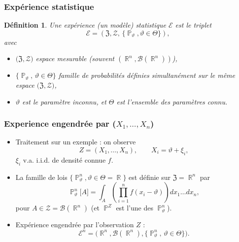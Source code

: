 ﻿\documentclass{beamer}
\newtheorem{df}{Définition}
\DeclareMathOperator{\R}{{\mathbb R}}
\DeclareMathOperator{\PP}{{\mathbb P}}
\begin{document}
\begin{frame}
\frametitle{Expérience statistique}
\begin{df}
Une expérience (un modèle) statistique ${\mathcal E}$ est le triplet
$${\mathcal E} = \left(\mathfrak{Z}, {\mathcal Z}, \,\big\{\PP_\vartheta, \vartheta \in \Theta\big\}\right),$$
avec
\begin{itemize}
\item $\big(\mathfrak{Z}, {\mathcal Z}\big)$ espace mesurable (souvent
$(\R^n,{\mathcal B}(\R^n))$),
\item $\{\PP_\vartheta,\,\vartheta \in \Theta\}$ famille de probabilités définies {\color{red}simultanément} sur le même espace  $\big(\mathfrak{Z}, {\mathcal Z}\big)$,
\item $\vartheta$ est le {\color{red}paramètre inconnu}, et $\Theta$ est {\color{red} l'ensemble des paramètres connu}.
\end{itemize}
\end{df}
\end{frame}




\begin{frame}
\frametitle{Experience engendrée par ($X_1,\ldots, X_n$)}
\begin{itemize}
\item {\color{red}Traitement sur un exemple} : on observe
$$Z = (X_1,\ldots, X_n), \quad\quad X_i= \vartheta + \xi_i,$$
$\xi_i$ v.a. i.i.d. de densit\'e {\color{red} connue} $f$.
\item La famille de lois $\big\{\PP_\vartheta^n,\vartheta \in \Theta  =
\R\big\}$ est définie sur $\mathfrak{Z}=\R^n$ par
$$\PP_\vartheta^n\big[A\big] = \int_A
\left(\prod_{i=1}^n f(x_i-\vartheta)\right) dx_1\ldots dx_n,
$$
pour $A\in{\mathcal Z}= {\mathcal B}(\R^n)$ (et $\PP^Z$ est l'une
des $\PP_\vartheta^n$).
\item Expérience {\color{red}engendrée par l'observation $Z$} :
$${\mathcal E}^n = \big(\R^n,{\mathcal B}(\R^n),\big\{\PP_\vartheta^n,\,\vartheta \in \Theta\big\}\big).$$
\end{itemize}
\end{frame}
\end{document}
